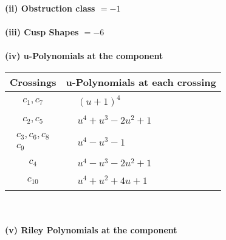 \documentclass[1p]{elsarticle_modified}
\theoremstyle{definition}
\begin{document}
\flushleft \textbf{(ii) Obstruction class $= -1$}\\~\\
\flushleft \textbf{(iii) Cusp Shapes $= -6$}\\~\\
\newpage\renewcommand{\arraystretch}{1}
\flushleft \textbf{(iv) u-Polynomials at the component}\newline \\
\begin{tabular}{m{50pt}|m{274pt}}
Crossings & \hspace{64pt}u-Polynomials at each crossing \\
\hline $$\begin{aligned}c_{1},c_{7}\end{aligned}$$&$\begin{aligned}
&(u+1)^4
\end{aligned}$\\
\hline $$\begin{aligned}c_{2},c_{5}\end{aligned}$$&$\begin{aligned}
&u^4+u^3-2 u^2+1
\end{aligned}$\\
\hline $$\begin{aligned}c_{3},c_{6},c_{8}\\c_{9}\end{aligned}$$&$\begin{aligned}
&u^4- u^3-1
\end{aligned}$\\
\hline $$\begin{aligned}c_{4}\end{aligned}$$&$\begin{aligned}
&u^4- u^3-2 u^2+1
\end{aligned}$\\
\hline $$\begin{aligned}c_{10}\end{aligned}$$&$\begin{aligned}
&u^4+u^2+4 u+1
\end{aligned}$\\
\hline
\end{tabular}\\~\\
\newpage\renewcommand{\arraystretch}{1}
\flushleft \textbf{(v) Riley Polynomials at the component}\newline \\
\end{document}
